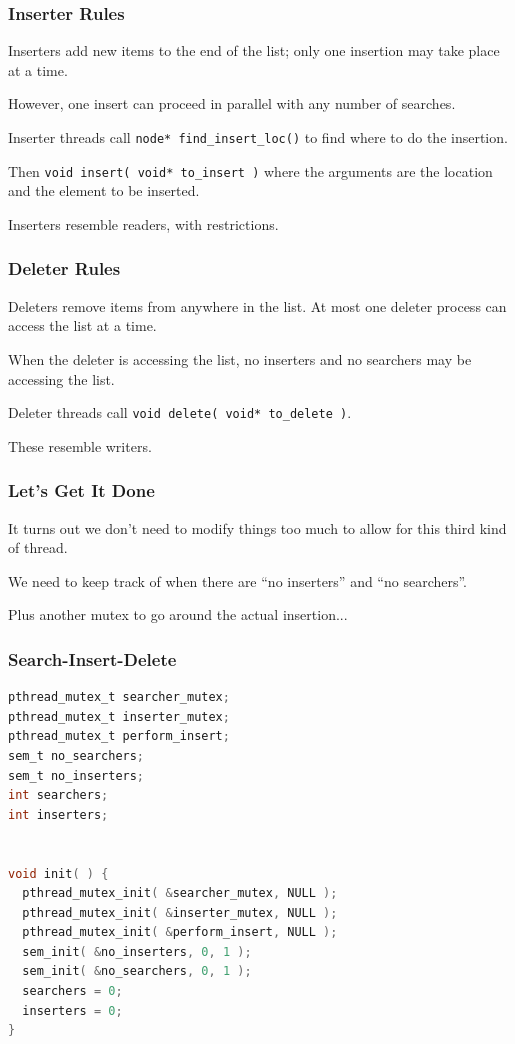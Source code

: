 \begin{frame}
	\frametitle{Inserter Rules}

	\alert{Inserters} add new items to the end of the list; only one insertion may take place at a time.

	However, one insert can proceed in parallel with any number of searches.

	Inserter threads call \texttt{node* find\_insert\_loc()} to find where to do the insertion.

	Then \texttt{void insert( void* to\_insert )} where the arguments are the location and the element to be inserted.

	Inserters resemble readers, with restrictions.

\end{frame}


\begin{frame}
	\frametitle{Deleter Rules}

	\alert{Deleters} remove items from anywhere in the list. At most one deleter process can access the list at a time.

	When the deleter is accessing the list, no inserters and no searchers may be accessing the list.

	Deleter threads call \texttt{void delete( void* to\_delete )}.

	These resemble writers.

\end{frame}


\begin{frame}
	\frametitle{Let's Get It Done}

	It turns out we don't need to modify things too much to allow for this third kind of thread.

	We need to keep track of when there are ``no inserters'' and ``no searchers''.

	Plus another mutex to go around the actual insertion...

\end{frame}


\begin{frame}[fragile]
	\frametitle{Search-Insert-Delete}
	\begin{lstlisting}[language=C]
pthread_mutex_t searcher_mutex;
pthread_mutex_t inserter_mutex;
pthread_mutex_t perform_insert;
sem_t no_searchers;
sem_t no_inserters;
int searchers;
int inserters;


void init( ) {
  pthread_mutex_init( &searcher_mutex, NULL );
  pthread_mutex_init( &inserter_mutex, NULL );
  pthread_mutex_init( &perform_insert, NULL );
  sem_init( &no_inserters, 0, 1 );
  sem_init( &no_searchers, 0, 1 );
  searchers = 0;
  inserters = 0;
}
\end{lstlisting}
\end{frame}

